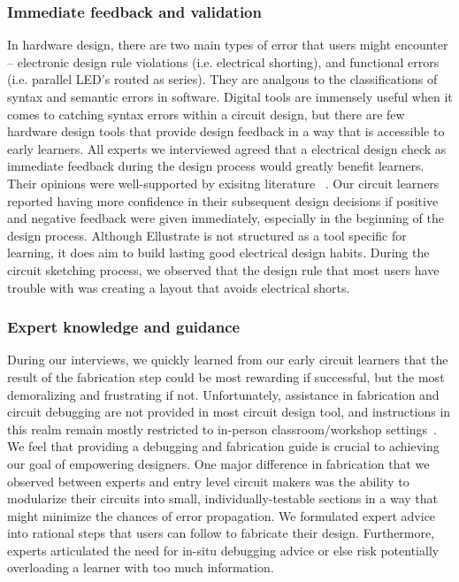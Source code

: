 \documentclass{sigchi}
\begin{document}
\subsubsection{Immediate feedback and validation}
In hardware design, there are two main types of error that users might encounter -- electronic design rule violations (i.e. electrical shorting), and functional errors (i.e. parallel LED's routed as series). They are analgous to the classifications of syntax and semantic errors in software. Digital tools are immensely useful when it comes to catching syntax errors within a circuit design, but there are few hardware design tools that provide design feedback in a way that is accessible to early learners. All experts we interviewed agreed that a electrical design check as immediate feedback during the design process would greatly benefit learners. Their opinions were well-supported by exisitng literature ~\cite{Hattie:2007gi,Epstein:2002ur}. Our circuit learners reported having more confidence in their subsequent design decisions if positive and negative feedback were given immediately, especially in the beginning of the design process. Although Ellustrate is not structured as a tool specific for learning, it does aim to build lasting good electrical design habits. During the circuit sketching process, we observed that the design rule that most users have trouble with was creating a layout that avoids electrical shorts.

\subsubsection{Expert knowledge and guidance}
During our interviews, we quickly learned from our early circuit learners that the result of the fabrication step could be most rewarding if successful, but the most demoralizing and frustrating if not. Unfortunately, assistance in fabrication and circuit debugging are not provided in most circuit design tool, and instructions in this realm remain mostly restricted to in-person classroom/workshop settings~\cite{Klemmer:2004ul}. We feel that providing a debugging and fabrication guide is crucial to achieving our goal of empowering designers. One major difference in fabrication that we observed between experts and entry level circuit makers was the ability to modularize their circuits into small, individually-testable sections in a way that might minimize the chances of error propagation. We formulated expert advice into rational steps that users can follow to fabricate their design. Furthermore, experts articulated the need for in-situ debugging advice or else risk potentially overloading a learner with too much information. 
\end{document}
